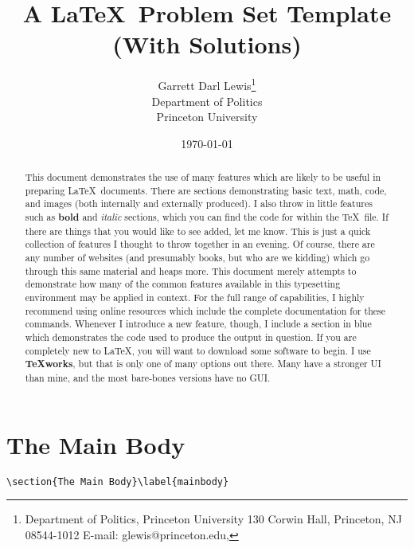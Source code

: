 \documentclass[letter,12pt]{article}
\title{A \LaTeX\ Problem Set Template (With Solutions)}
\author{Garrett Darl Lewis\thanks{Department of Politics, Princeton University  130 Corwin Hall, Princeton, NJ 08544-1012  E-mail: glewis@princeton.edu, }\\ Department of Politics\\ Princeton University}
\date{\today}
\begin{document}
\maketitle
\tableofcontents

\begin{abstract}
This document demonstrates the use of many features which are likely to be useful in preparing \LaTeX\ documents.  There are sections demonstrating basic text, math, code, and images (both internally and externally produced).  I also throw in little features such as \textbf{bold} and \textit{italic} sections, which you can find the code for within the \TeX\ file.  If there are things that you would like to see added, let me know.  This is just a quick collection of features I thought to throw together in an evening.  Of course, there are any number of websites (and presumably books, but who are we kidding) which go through this same material and heaps more.  This document merely attempts to demonstrate how many of the common features available in this typesetting environment may be applied in context.  For the full range of capabilities, I highly recommend using online resources which include the complete documentation for these commands.  Whenever I introduce a new feature, though, I include a section in blue which demonstrates the code used to produce the output in question.  If you are completely new to \LaTeX , you will want to download some software to begin.  I use \textbf{TeXworks}, but that is only one of many options out there.  Many have a stronger UI than mine, and the most bare-bones versions have no GUI.
\end{abstract}







\section{The Main Body}\label{mainbody}

\begin{lstlisting}
\section{The Main Body}\label{mainbody}
\end{lstlisting}

\end{document}

